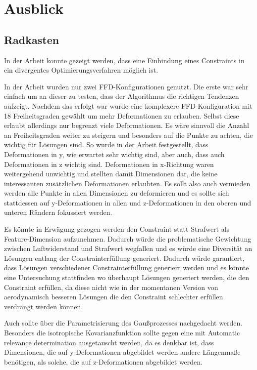 \section{Ausblick}

\subsection{Radkasten}

In der Arbeit konnte gezeigt werden, dass eine Einbindung eines Constraints in ein divergentes Optimierungsverfahren möglich ist.

In der Arbeit wurden nur zwei FFD-Konfigurationen genutzt.
Die erste war sehr einfach um an dieser zu testen, dass der Algorithmus die richtigen Tendenzen aufzeigt.
Nachdem das erfolgt war wurde eine komplexere FFD-Konfiguration mit 18 Freiheitsgraden gewählt um mehr Deformationen zu erlauben.
Selbst diese erlaubt allerdings nur begrenzt viele Deformationen.
Es wäre sinnvoll die Anzahl an Freiheitsgraden weiter zu steigern und besonders auf die Punkte zu achten, die wichtig für Lösungen sind.
So wurde in der Arbeit festgestellt, dass Deformationen in y, wie erwartet sehr wichtig sind, aber auch, dass auch Deformationen in z wichtig sind.
Deformationen in x-Richtung waren weitergehend unwichtig und stellten damit Dimensionen dar, die keine interessanten zusätzlichen Deformationen erlaubten.
Es sollt also auch vermieden werden alle Punkte in allen Dimensionen zu deformieren und es sollte sich stattdessen auf y-Deformationen in allen und z-Deformationen in den oberen und unteren Rändern fokussiert werden.

Es könnte in Erwägung gezogen werden den Constraint statt Strafwert als Feature-Dimension aufzunehmen.
Dadurch würde die problematische Gewichtung zwischen Luftwiderstand und Strafwert wegfallen und es würde eine Diversität an Lösungen entlang der Constrainterfüllung generiert.
Dadurch würde garantiert, dass Lösungen verschiedener Constrainterfüllung generiert werden und es könnte eine Untersuchung stattfinden wo überhaupt Lösungen generiert werden, die den Constraint erfüllen, da diese nicht wie in der momentanen Version von aerodynamisch besseren Lösungen die den Constraint schlechter erfüllen verdrängt werden können.

Auch sollte über die Parametrisierung des Gaußprozesses nachgedacht werden.
Besonders die isotropische Kovarianzfunktion sollte gegen eine mit Automatic relevance determination ausgetauscht werden, da es denkbar ist, dass Dimensionen, die auf y-Deformationen abgebildet werden andere Längenmaße benötigen, als solche, die auf z-Deformationen abgebildet werden.

